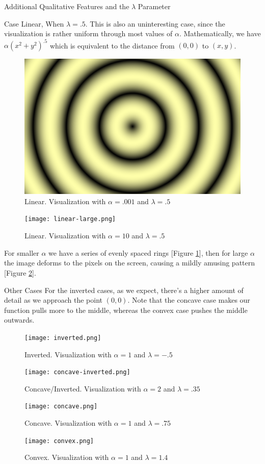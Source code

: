 \documentclass[11pt]{article}
\newcommand{\reffig}[1]{[Figure \ref{#1}]}
\begin{document}
\begin{section}{Additional Qualitative Features and the $\lambda$ Parameter}
\begin{subsection}{Case {\normalfont\textsf{Linear}}, When $\lambda = .5$.}
This is also an uninteresting case, since the visualization is rather uniform through most values of $\alpha$. Mathematically, we have $\alpha(x^2 + y^2)^{.5}$ which is equivalent to the distance from $(0, 0)$ to $(x, y)$. \\
\begin{figure}[h]
\centering
\includegraphics[width=.9\textwidth]{linear-small.png}
\caption{Linear. Visualization with $\alpha = .001$ and $\lambda = .5$}
\label{fig:linearSmall}
\end{figure}
\begin{figure}[h]
\centering
\texttt{[image: linear-large.png]}
\caption{Linear. Visualization with $\alpha = 10$ and $\lambda = .5$}
\label{fig:linearLarge}
\end{figure}
For smaller $\alpha$ we have a series of evenly spaced rings \reffig{fig:linearSmall}, then for large $\alpha$ the image deforms to the pixels on the screen, causing a mildly amusing pattern \reffig{fig:linearLarge}. 
\end{subsection}
\begin{subsection}{Other Cases}
For the inverted cases, as we expect, there's a higher amount of detail as we approach the point $(0, 0)$. Note that the concave case makes our function pulls more to the middle, whereas the convex case pushes the middle outwards. 
\begin{figure}[h]
\centering
\texttt{[image: inverted.png]}
\caption{Inverted. Visualization with $\alpha = 1$ and $\lambda = -.5$}
\label{fig:inverted}
\end{figure}
\begin{figure}[h]
\centering
\texttt{[image: concave-inverted.png]}
\caption{Concave/Inverted. Visualization with $\alpha = 2$ and $\lambda = .35$}
\label{fig:concaveinverted}
\end{figure}
\begin{figure}[h]
\centering
\texttt{[image: concave.png]}
\caption{Concave. Visualization with $\alpha = 1$ and $\lambda = .75$}
\label{fig:concave}
\end{figure}
\begin{figure}[h]
\centering
\texttt{[image: convex.png]}
\caption{Convex. Visualization with $\alpha = 1$ and $\lambda = 1.4$}
\label{fig:convex}
\end{figure}
\end{subsection}
\end{section}
\end{document}
